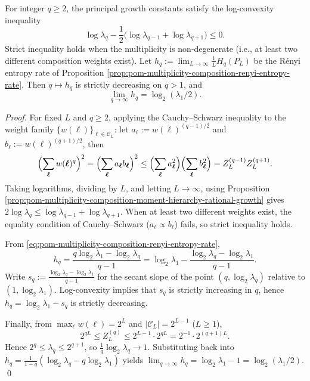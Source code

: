 \begin{proposition}\label{prop:pom-multiplicity-composition-logconvex-lambdaq}
For integer \(q\ge 2\), the principal growth constants satisfy the log-convexity inequality
\[
\boxed{\;
\log \lambda_q-\frac12\bigl(\log \lambda_{q-1}+\log \lambda_{q+1}\bigr)\le 0.\;}
\]
Strict inequality holds when the multiplicity is non-degenerate (i.e., at least two different composition weights exist).
Let
\(
h_q:=\lim_{L\to\infty}\frac{1}{L}H_q(P_L)
\)
be the R\'enyi entropy rate of Proposition \ref{prop:pom-multiplicity-composition-renyi-entropy-rate}. Then \(q\mapsto h_q\) is strictly decreasing on \(q>1\), and
\[
\boxed{\;
\lim_{q\to\infty}h_q=\log_2(\lambda_1/2).\;}
\]
\end{proposition}
\begin{proof}
For fixed \(L\) and \(q\ge 2\), applying the Cauchy--Schwarz inequality to the weight family \(\{w(\boldsymbol{\ell})\}_{\boldsymbol{\ell}\in\mathcal{C}_L}\):
let \(a_{\boldsymbol{\ell}}:=w(\boldsymbol{\ell})^{(q-1)/2}\) and \(b_{\boldsymbol{\ell}}:=w(\boldsymbol{\ell})^{(q+1)/2}\), then
\[
\Bigl(\sum_{\boldsymbol{\ell}}w(\boldsymbol{\ell})^{q}\Bigr)^2
=\Bigl(\sum_{\boldsymbol{\ell}}a_{\boldsymbol{\ell}}b_{\boldsymbol{\ell}}\Bigr)^2
\le
\Bigl(\sum_{\boldsymbol{\ell}}a_{\boldsymbol{\ell}}^2\Bigr)\Bigl(\sum_{\boldsymbol{\ell}}b_{\boldsymbol{\ell}}^2\Bigr)
=Z_L^{(q-1)}Z_L^{(q+1)}.
\]
Taking logarithms, dividing by \(L\), and letting \(L\to\infty\), using Proposition \ref{prop:pom-multiplicity-composition-moment-hierarchy-rational-growth} gives
\(
2\log\lambda_q\le \log\lambda_{q-1}+\log\lambda_{q+1}
\).
When at least two different weights exist, the equality condition of Cauchy--Schwarz (\(a_{\boldsymbol{\ell}}\propto b_{\boldsymbol{\ell}}\)) fails, so strict inequality holds.
\par
From \eqref{eq:pom-multiplicity-composition-renyi-entropy-rate},
\[
h_q
=\frac{q\log_2\lambda_1-\log_2\lambda_q}{q-1}
=\log_2\lambda_1-\frac{\log_2\lambda_q-\log_2\lambda_1}{q-1}.
\]
Write \(s_q:=\frac{\log_2\lambda_q-\log_2\lambda_1}{q-1}\) for the secant slope of the point \((q,\log_2\lambda_q)\) relative to \((1,\log_2\lambda_1)\).
Log-convexity implies that \(s_q\) is strictly increasing in \(q\), hence \(h_q=\log_2\lambda_1-s_q\) is strictly decreasing.
\par
Finally, from \(\max_{\boldsymbol{\ell}}w(\boldsymbol{\ell})=2^L\) and \(|\mathcal{C}_L|=2^{L-1}\) (\(L\ge 1\)),
\[
2^{qL}\le Z_L^{(q)}\le 2^{L-1}\cdot 2^{qL}=2^{-1}\cdot 2^{(q+1)L}.
\]
Hence \(2^q\le \lambda_q\le 2^{q+1}\), so \(\frac{1}{q}\log_2\lambda_q\to 1\).
Substituting back into \(h_q=\frac{1}{1-q}(\log_2\lambda_q-q\log_2\lambda_1)\) yields
\(
\lim_{q\to\infty}h_q=\log_2\lambda_1-1=\log_2(\lambda_1/2)
\). \qed
\end{proof}


\endinput


